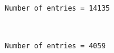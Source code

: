 \documentclass[11pt]{article}
\begin{document}
    \begin{Verbatim}[commandchars=\\\{\}]
Number of entries = 14135

    \end{Verbatim}

    \begin{center}
    \end{center}
    { \hspace*{\fill} \\}
    
    \begin{Verbatim}[commandchars=\\\{\}]
Number of entries = 4059

    \end{Verbatim}


    
    
    
    
\end{document}
